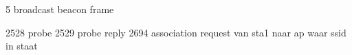 5 broadcast beacon frame

2528 probe 
2529 probe reply
2694 association request van sta1 naar ap waar ssid in staat


